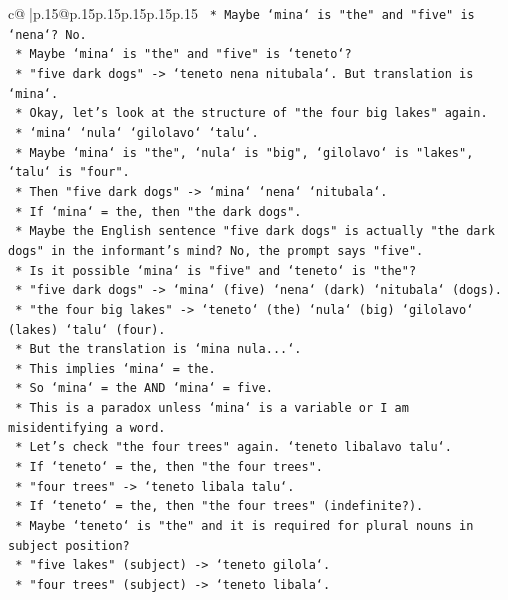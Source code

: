 \documentclass{article}
\begin{document}
{\begin{supertabular}{c@{$\;$}|p{.15\linewidth}@{}p{.15\linewidth}p{.15\linewidth}p{.15\linewidth}p{.15\linewidth}p{.15\linewidth}}
{{{\texttt{    *   Maybe `mina` is "the" and "five" is `nena`? No.} \\
\texttt{    *   Maybe `mina` is "the" and "five" is `teneto`?} \\
\texttt{    *   "five dark dogs" {-}> `teneto nena nitubala`. But translation is `mina`.} \\
\texttt{    *   Okay, let's look at the structure of "the four big lakes" again.} \\
\texttt{    *   `mina` `nula` `gilolavo` `talu`.} \\
\texttt{    *   Maybe `mina` is "the", `nula` is "big", `gilolavo` is "lakes", `talu` is "four".} \\
\texttt{    *   Then "five dark dogs" {-}> `mina` `nena` `nitubala`.} \\
\texttt{    *   If `mina` = the, then "the dark dogs".} \\
\texttt{    *   Maybe the English sentence "five dark dogs" is actually "the dark dogs" in the informant's mind? No, the prompt says "five".} \\
\texttt{    *   Is it possible `mina` is "five" and `teneto` is "the"?} \\
\texttt{    *   "five dark dogs" {-}> `mina` (five) `nena` (dark) `nitubala` (dogs).} \\
\texttt{    *   "the four big lakes" {-}> `teneto` (the) `nula` (big) `gilolavo` (lakes) `talu` (four).} \\
\texttt{    *   But the translation is `mina nula...`.} \\
\texttt{    *   This implies `mina` = the.} \\
\texttt{    *   So `mina` = the AND `mina` = five.} \\
\texttt{    *   This is a paradox unless `mina` is a variable or I am misidentifying a word.} \\
\texttt{    *   Let's check "the four trees" again. `teneto libalavo talu`.} \\
\texttt{    *   If `teneto` = the, then "the four trees".} \\
\texttt{    *   "four trees" {-}> `teneto libala talu`.} \\
\texttt{    *   If `teneto` = the, then "the four trees" (indefinite?).} \\
\texttt{    *   Maybe `teneto` is "the" and it is required for plural nouns in subject position?} \\
\texttt{    *   "five lakes" (subject) {-}> `teneto gilola`.} \\
\texttt{    *   "four trees" (subject) {-}> `teneto libala`.} \\
}}}
\end{supertabular}}
\end{document}

